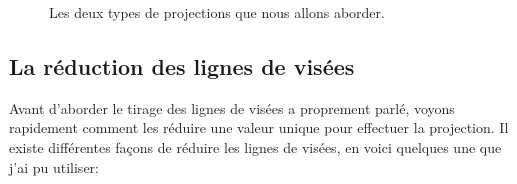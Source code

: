 \begin{figure}[bth]
    \center
    \qquad
    \caption[Deux types de projections]{Les deux types de projections que nous allons aborder.}
 	\label{fig:raycast_projection}
\end{figure}


\subsection{La réduction des lignes de visées}

Avant d'aborder le tirage des lignes de visées a proprement parlé, voyons rapidement comment les réduire une valeur unique pour effectuer la projection.
Il existe différentes façons de réduire les lignes de visées, en voici quelques une que j'ai pu utiliser:

